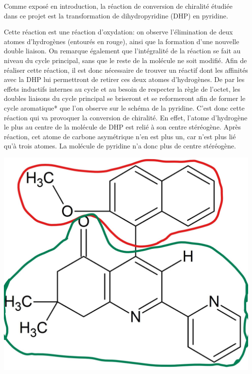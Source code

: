 \documentclass{article}
\begin{document}
Comme exposé en introduction, la réaction de conversion de chiralité étudiée dans ce projet est la transformation de dihydropyridine (DHP) en pyridine. \par
\medbreak
Cette réaction est une réaction d’oxydation: on observe l’élimination de deux atomes d’hydrogènes (entourés en rouge), ainsi que la formation d’une nouvelle double liaison.  On remarque également que l’intégralité de la réaction se fait au niveau du cycle principal, sans que le reste de la molécule ne soit modifié.
Afin de réaliser cette réaction, il est donc nécessaire de trouver un réactif dont les affinités avec la DHP lui permettront de retirer ces deux atomes d’hydrogènes. De par les effets inductifs internes au cycle et au besoin de respecter la règle de l’octet, les doubles liaisons du cycle principal se briseront et se reformeront afin de former le cycle aromatique* que l’on observe sur le schéma de la pyridine.
\medbreak
C’est donc cette réaction qui va provoquer la conversion de chiralité. En effet, l’atome d’hydrogène le plus au centre de la molécule de DHP est relié à son centre stéréogène. Après réaction, cet atome de carbone asymétrique n’en est plus un, car n’est plus lié qu’à trois atomes. La molécule de pyridine n’a donc plus de centre stéréogène. 
\medbreak

\begin{center}
\includegraphics[scale = 0.1]{b}
\end{center}
\end{document}
